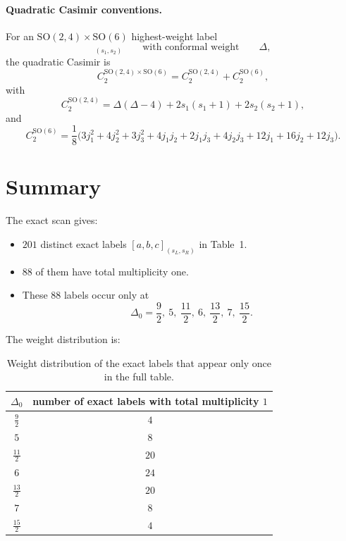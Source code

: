 \documentclass[12pt]{article}
\newcommand{\SO}{\mathrm{SO}}
\newcommand{\D}{\Delta}
\begin{document}
\paragraph{Quadratic Casimir conventions.}
For an $\SO(2,4)\times \SO(6)$ highest-weight label
\begin{equation}
[j_1,j_2,j_3]_{(s_1,s_2)}
\qquad\text{with conformal weight}\qquad \D,
\end{equation}
the quadratic Casimir is
\begin{equation}
C_2^{\SO(2,4)\times \SO(6)}
=
C_2^{\SO(2,4)}+C_2^{\SO(6)},
\end{equation}
with
\begin{equation}
C_2^{\SO(2,4)}
=
\D(\D-4)+2s_1(s_1+1)+2s_2(s_2+1),
\end{equation}
and
\begin{equation}
C_2^{\SO(6)}
=
\frac18\Big(
3j_1^2+4j_2^2+3j_3^2
+4j_1j_2+2j_1j_3+4j_2j_3
+12j_1+16j_2+12j_3
\Big).
\end{equation}

\section{Summary}

The exact scan gives:
\begin{itemize}
\item $201$ distinct exact labels $[a,b,c]_{(s_L,s_R)}$ in Table~1.
\item $88$ of them have total multiplicity one.
\item These $88$ labels occur only at
\begin{equation}
\D_0=\frac{9}{2},\ 5,\ \frac{11}{2},\ 6,\ \frac{13}{2},\ 7,\ \frac{15}{2}.
\end{equation}
\end{itemize}

The weight distribution is:
\begin{table}[h]
\centering
\begin{tabular}{cc}
\toprule
$\D_0$ & number of exact labels with total multiplicity $1$ \\
\midrule
$\frac{9}{2}$ & $4$ \\
$5$ & $8$ \\
$\frac{11}{2}$ & $20$ \\
$6$ & $24$ \\
$\frac{13}{2}$ & $20$ \\
$7$ & $8$ \\
$\frac{15}{2}$ & $4$ \\
\bottomrule
\end{tabular}
\caption{Weight distribution of the exact labels that appear only once in the full table.}
\label{tab:summary}
\end{table}
\end{document}
